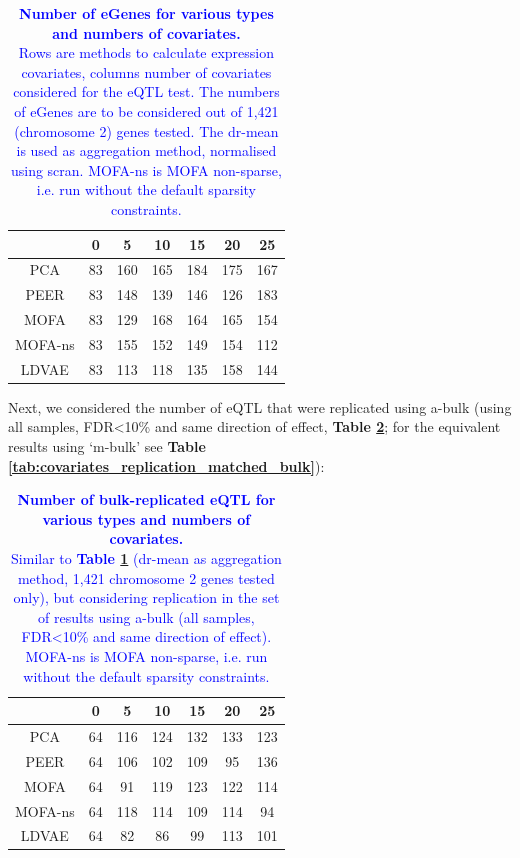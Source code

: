 \begin{table}[h]
    \centering
    \begin{tabular}{c|c c c c c c}
    &          0 & 5 & 10 & 15 & 20 & 25  \\
    \hline
    PCA      & 83 & 160 & 165 & 184 & 175 & 167 \\
    PEER     & 83 & 148 & 139 & 146 & 126 & 183 \\
    MOFA     & 83 & 129 & 168 & 164 & 165 & 154 \\
    MOFA-ns  & 83 & 155 & 152 & 149 & 154 & 112 \\
    LDVAE    & 83 & 113 & 118 & 135 & 158 & 144 \\
    \end{tabular}
    \caption[Number and type of covariate comparison]{\textcolor{blue}{\textbf{Number of eGenes for various types and numbers of covariates.}\\
    Rows are methods to calculate expression covariates, columns number of covariates considered for the eQTL test.
    The numbers of eGenes are to be considered out of 1,421 (chromosome 2) genes tested.
    The dr-mean is used as aggregation method, normalised using scran.
    MOFA-ns is MOFA non-sparse, i.e. run without the default sparsity constraints.}}
    \label{tab:covariates}
\end{table}

Next, we considered the number of eQTL that were replicated using a-bulk (using all samples, FDR<10\% and same direction of effect, \textbf{Table \ref{tab:covariates_replication}}; for the equivalent results using `m-bulk' see \textbf{Table \ref{tab:covariates_replication_matched_bulk}}):

\begin{table}[h]
    \centering
    \begin{tabular}{c|c c c c c c}
    &          0 & 5 & 10 & 15 & 20 & 25  \\
    \hline
    PCA      & 64 & 116 & 124 & 132 & 133 & 123 \\
    PEER     & 64 & 106 & 102 & 109 &  95 & 136 \\
    MOFA     & 64 &  91 & 119 & 123 & 122 & 114 \\
    MOFA-ns  & 64 & 118 & 114 & 109 & 114 &  94 \\
    LDVAE    & 64 &  82 &  86 &  99 & 113 & 101 \\
    \end{tabular}
    \caption[Covariate comparison in terms of replication of bulk results]{\textcolor{blue}{\textbf{Number of bulk-replicated eQTL for various types and numbers of covariates.} \\
    Similar to \textbf{Table \ref{tab:covariates}} (dr-mean as aggregation method, 1,421 chromosome 2 genes tested only), but considering replication in the set of results using a-bulk (all samples, FDR<10\% and same direction of effect).
    MOFA-ns is MOFA non-sparse, i.e. run without the default sparsity constraints.}}
    \label{tab:covariates_replication}
\end{table}

